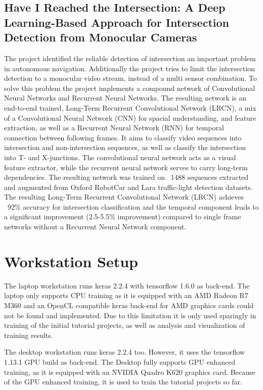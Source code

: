 \documentclass[sigconf, nonacm]{acmart}
\begin{document}
\subsection{Have  I  Reached  the  Intersection:  A  Deep  Learning-Based  Approach  for Intersection  Detection  from  Monocular  Cameras \cite{IntersectNet}}
The project identified the reliable detection of intersection an important problem in autonomous navigation.
Additionally the project tries to limit the intersection detection to a monocular video stream, instead of a multi sensor combination.
To solve this problem the project implements a compound network of Convolutional Neural Networks and Recurrent Neural Networks.
The resulting network is an end-to-end trained, Long-Term Recurrent Convolutional Network (LRCN), a mix of a Convolutional Neural Network (CNN) for spacial understanding, and feature extraction, as well as a Recurrent Neural Network (RNN) for temporal connection between following frames.
It aims to classify video sequences into intersection and non-intersection sequences, as well as classify the intersection into T- and X-junctions.
The convolutional neural network acts as a visual feature extractor, while the recurrent neural network serves to carry long-term dependencies.
The resulting network was trained on ~1488 sequences extracted and augmented from Oxford RobotCar and Lara traffic-light detection datasets. The resulting Long-Term Recurrent Convolutional Network (LRCN) achieves ~92\% accuracy for intersection classification and the temporal component leads to a significant improvement (2.5-5.5\% improvement) compared to single frame networks without a Recurrent Neural Network component.

\section{Workstation Setup}
The laptop workstation runs keras 2.2.4 with tensorflow 1.6.0 as back-end.
The laptop only supports CPU training as it is equipped with an AMD Radeon R7 M360 and an OpenCL compatible keras back-end for AMD graphics cards could not be found and implemented.
Due to this limitation it is only used sparingly in training of the initial tutorial projects, as well as analysis and visualization of training results.

The desktop workstation runs keras 2.2.4 too. However, it uses the tensorflow 1.13.1 GPU build as back-end.
The Desktop fully supports GPU enhanced training, as it is equipped with an NVIDIA Quadro K620 graphics card.
Because of the GPU enhanced training, it is used to train the tutorial projects so far.
\end{document}
